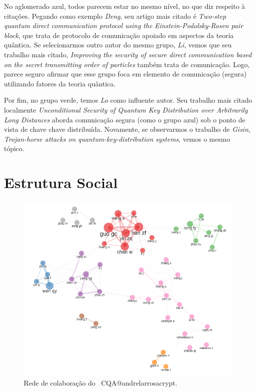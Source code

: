 No aglomerado azul, todos parecem estar no mesmo nível, no que diz respeito à citações. Pegando como exemplo \textit{Deng}, seu artigo mais citado é \textit{Two-step quantum direct communication protocol using the Einstein-Podolsky-Rosen pair block}, que trata de protocolo de comunicação apoiado em aspectos da teoria quântica. Se selecionarmos outro autor do mesmo grupo, \textit{Li}, vemos que seu trabalho mais citado, \textit{Improving the security of secure direct communication based on the secret transmitting order of particles} também trata de comunicação. Logo, parece seguro afirmar que esse grupo foca em elemento de comunicação (segura) utilizando fatores da teoria quântica.

Por fim, no grupo verde, temos \textit{Lo} como influente autor. Seu trabalho mais citado localmente \textit{Unconditional Security of Quantum Key Distribution over Arbitrarily Long Distances} aborda comunicação segura (como o grupo azul) sob o ponto de vista de chave chave distribuída. Novamente, se observarmos o trabalho de \textit{Gisin}, \textit{Trojan-horse attacks on quantum-key-distribution systems}, vemos o mesmo tópico.


\section{Estrutura Social}

\begin{figure}
    \centering
    \includegraphics[angle=0,width=1\textwidth]{experiments/andrelarrosacrypt/AnaliseBibliometrica/CriptografiaQuantica/imagens/CQA@andrelarrosacrypt_Colab.png}
    \caption{Rede de colaboração do \dataset\ CQA@andrelarrosacrypt.}
    \label{CQA@andrelarrosacrypt_Colab}
\end{figure}

